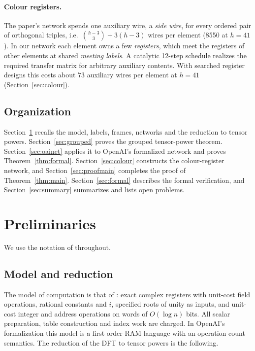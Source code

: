 \documentclass[11pt]{article}
\theoremstyle{definition}
\theoremstyle{remark}
\begin{document}
\paragraph{Colour registers.} The paper's network spends one auxiliary wire, a \emph{side wire},
for every ordered pair of orthogonal triples, i.e.\ $\binom{h-3}3+3(h-3)$ wires per element (8550 at
$h=41$). In our network each element owns a few \emph{registers}, which meet the registers of other
elements at shared \emph{meeting labels}. A catalytic 12-step schedule realizes the required transfer
matrix for arbitrary auxiliary contents. With searched register designs this costs about $73$
auxiliary wires per element at $h=41$ (Section~\ref{sec:colour}).

\subsection{Organization}
Section~\ref{sec:prelim} recalls the model, labels, frames, networks and the reduction to tensor
powers. Section~\ref{sec:grouped} proves the grouped tensor-power theorem. Section~\ref{sec:oainet}
applies it to OpenAI's formalized network and proves Theorem~\ref{thm:formal}.
Section~\ref{sec:colour} constructs the colour-register network, and Section~\ref{sec:proofmain}
completes the proof of Theorem~\ref{thm:main}. Section~\ref{sec:formal} describes the formal
verification, and Section~\ref{sec:summary} summarizes and lists open problems.

\section{Preliminaries}\label{sec:prelim}

We use the notation of \cite{oai} throughout.

\subsection{Model and reduction}
The model of computation is that of \cite[Section~1]{oai}: exact complex registers with unit-cost
field operations, rational constants and $i$, specified roots of unity as inputs, and unit-cost integer
and address operations on words of $O(\log n)$ bits. All scalar preparation, table construction and
index work are charged. In OpenAI's formalization \cite{oailean} this model is a first-order RAM
language with an operation-count semantics. The reduction of the DFT to tensor
powers is the following.
\end{document}

